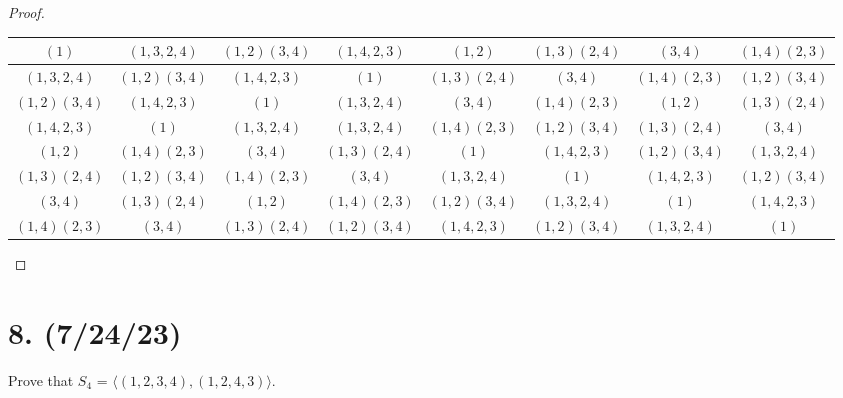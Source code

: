 \documentclass{article}
\begin{document}
\begin{proof}
    \begin{table}[h]
        \scriptsize
        \setlength{\tabcolsep}{0.4em} %
        \begin{tabular}{ |c|c|c|c|c|c|c|c| } 
            \hline
            $(1)$ & $(1, 3, 2, 4)$ & $(1, 2)(3, 4)$ & $(1, 4, 2, 3)$ & $(1, 2)$ & $(1, 3)(2, 4)$ & $(3, 4)$ & $(1, 4)(2, 3)$ \\
            \hline
            $(1, 3, 2, 4)$ & $(1, 2)(3, 4)$ & $(1, 4, 2, 3)$ & $(1)$ & $(1, 3)(2, 4)$ & $(3, 4)$ & $(1, 4)(2, 3)$ & $(1, 2)(3, 4)$ \\ 
            \hline
            $(1, 2)(3, 4)$ & $(1, 4, 2, 3)$ & $(1)$ & $(1, 3, 2, 4)$ & $(3, 4)$ & $(1, 4)(2, 3)$ & $(1, 2)$ & $(1, 3)(2, 4)$ \\
            \hline
            $(1, 4, 2, 3)$ & $(1)$ & $(1, 3, 2, 4)$ & $(1, 3, 2, 4)$ & $(1, 4)(2, 3)$ & $(1, 2)(3, 4)$ & $(1, 3)(2, 4)$ & $(3, 4)$ \\
            \hline
            $(1, 2)$ & $(1, 4)(2, 3)$ & $(3, 4)$ & $(1, 3)(2, 4)$ & $(1)$ & $(1, 4, 2, 3)$ & $(1, 2)(3, 4)$ & $(1, 3, 2, 4)$ \\
            \hline
            $(1, 3)(2, 4)$ & $(1, 2)(3, 4)$ & $(1, 4)(2, 3)$ & $(3, 4)$ & $(1, 3, 2, 4)$ & $(1)$ & $(1, 4, 2, 3)$ & $(1, 2)(3, 4)$ \\
            \hline
            $(3, 4)$ & $(1, 3)(2, 4)$ & $(1, 2)$ & $(1, 4)(2, 3)$ & $(1, 2)(3, 4)$ & $(1, 3, 2, 4)$ & $(1)$ & $(1, 4, 2, 3)$ \\
            \hline
            $(1, 4)(2, 3)$ & $(3, 4)$ & $(1, 3)(2, 4)$ & $(1, 2)(3, 4)$ & $(1, 4, 2, 3)$ & $(1, 2)(3, 4)$ & $(1, 3, 2, 4)$ & $(1)$ \\
            \hline
        \end{tabular}
    \end{table}
\end{proof}

\section*{8. (7/24/23)}

Prove that $S_4$ = $\langle (1, 2, 3, 4), (1, 2, 4, 3) \rangle$.
\end{document}
